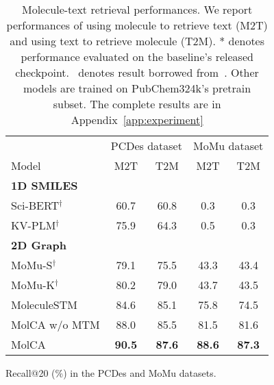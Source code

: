 \documentclass[11pt]{article}
\begin{document}
\begin{table}[t!]
\begin{subtable}[t]{0.45\textwidth}
        \small
        \centering
        \begin{tabular}{lcccc} \toprule
                & \multicolumn{2}{c}{PCDes dataset}           & \multicolumn{2}{c}{MoMu dataset}            \\
\cmidrule(lr){2-3} \cmidrule(lr){4-5}
        Model              & M2T                  & T2M                  & M2T                  & T2M                  \\\midrule
        \textbf{1D SMILES} & \multicolumn{1}{l}{} & \multicolumn{1}{l}{} & \multicolumn{1}{l}{} & \multicolumn{1}{l}{} \\
        Sci-BERT$^\dag$           & 60.7                 & 60.8                 & 0.3                  & 0.3                  \\
        KV-PLM$^\dag$             & 75.9                 & 64.3                 & 0.5                  & 0.3                  \\\midrule
        \textbf{2D Graph}  & \multicolumn{1}{l}{} & \multicolumn{1}{l}{} & \multicolumn{1}{l}{} & \multicolumn{1}{l}{} \\
        MoMu-S$^\dag$             & 79.1                 & 75.5                 & 43.3                 & 43.4                 \\
        MoMu-K$^\dag$             & 80.2                 & 79.0                 & 43.7                 & 43.5                 \\
        MoleculeSTM       & 84.6                 & 85.1                 & 75.8                 & 74.5                 \\
        MolCA w/o MTM      & 88.0                 & 85.5                 & 81.5                 & 81.6                 \\
        MolCA              & \textbf{90.5}        & \textbf{87.6}        & \textbf{88.6}        & \textbf{87.3}       \\\bottomrule
        \end{tabular}
        \caption{Recall@20 (\%) in the PCDes and MoMu datasets. }
        \label{tab:retrieval_twoothers}
    \end{subtable}
    \caption{Molecule-text retrieval performances. We report performances of using molecule to retrieve text (M2T) and using text to retrieve molecule (T2M). * denotes performance evaluated on the baseline's released checkpoint. \dag ~denotes result borrowed from~\citep{MoMu}. Other models are trained on PubChem324k's pretrain subset. The complete results are in Appendix~\ref{app:experiment}}
    \label{tab:retrieval}
 \vspace{-4mm}
    \end{table}
\end{document}

